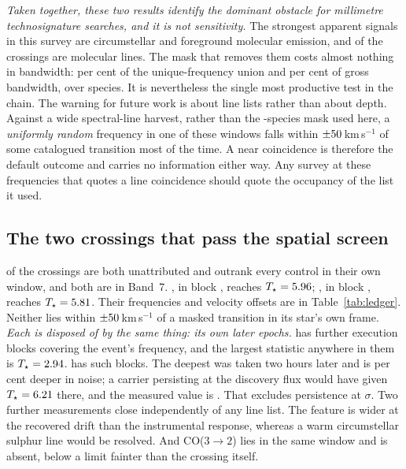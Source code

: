 \emph{Taken together, these two results identify the dominant obstacle for
millimetre technosignature searches, and it is not sensitivity.} The
strongest apparent signals in this survey are circumstellar and foreground
molecular emission, and \NAttributed{} of the \NCross{} crossings are
molecular lines. The mask that removes them costs almost nothing in
bandwidth: \MaskUnionPct{} per cent of the unique-frequency union and
\MaskGrossPct{} per cent of gross bandwidth, over \MaskNSpecNew{} species.
It is nevertheless the single most productive test in the chain. The warning
for future work is about line lists rather than about depth. Against a wide
spectral-line harvest, rather than the \MaskNSpecNew-species mask used here,
a \emph{uniformly random} frequency in one of these windows falls within
$\pm50$\,km\,s$^{-1}$ of some catalogued transition most of the
time. A near coincidence is therefore the default outcome and carries no
information either way. Any survey at these frequencies that quotes a line
coincidence should quote the occupancy of the list it used.

\subsection{The two crossings that pass the spatial screen}
\label{sec:chaingap}

\NUnattrRankFlagged{} of the \NCross{} crossings are both unattributed and
outrank every control in their own window, and both are in Band~7.
\EpGapStar, in block \EpGapEb, reaches $T_\star=5.96$; \EpOutStar, in
block \EpOutEb, reaches $T_\star=5.81$. Their frequencies and velocity
offsets are in Table~\ref{tab:ledger}. Neither lies within
$\pm50$\,km\,s$^{-1}$ of a masked transition in its star's own
frame. \emph{Each is disposed of by the same thing: its own later epochs.}
\EpGapStar{} has \EpGapNRep{} further execution blocks covering the event's
frequency, and the largest statistic anywhere in them is
$T_\star=2.94$. \EpOutStar{} has \EpOutNRep{} such blocks. The
deepest was taken two hours later and is \CpRecDeeperPct{} per cent deeper
in noise; a carrier persisting at the discovery flux would have given
$T_\star=6.21$ there, and the measured value is \CpRecT. That excludes
persistence at \CpRecExclCond$\sigma$. Two further measurements close
\EpOutStar{} independently of any line list. The feature is wider at the
recovered drift than the instrumental response, whereas a warm circumstellar
sulphur line would be resolved. And CO($3{\to}2$) lies in the same window
and is absent, below a limit fainter than the crossing itself.

